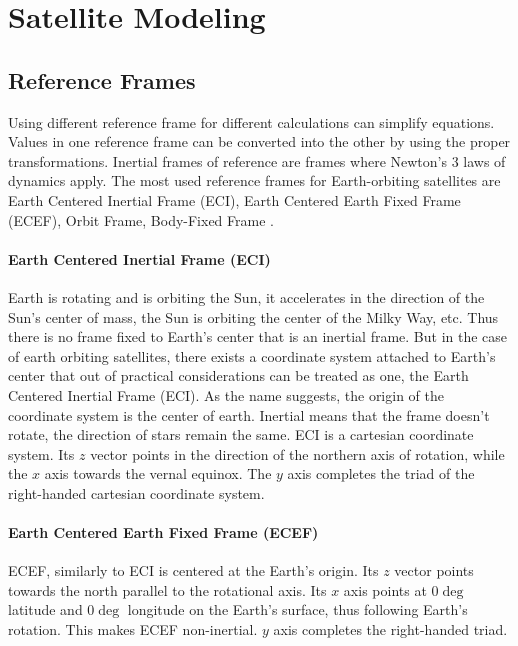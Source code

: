 \chapter{Satellite Modeling}

\section{Reference Frames}

Using different reference frame for different calculations can simplify equations. Values in one reference frame can be converted into the other by using the proper transformations.
Inertial frames of reference are frames where Newton's 3 laws of dynamics apply.
The most used reference frames for Earth-orbiting satellites are Earth Centered Inertial Frame (ECI), Earth Centered Earth Fixed Frame (ECEF), Orbit Frame, Body-Fixed Frame  \cite{ref1} \cite{ref2}.

\subsubsection{Earth Centered Inertial Frame (ECI)}
Earth is rotating and is orbiting the Sun, it accelerates in the direction of the Sun's center of mass, the Sun is orbiting the center of the Milky Way, etc. Thus there is no frame fixed to Earth's center that is an inertial frame. But in the case of earth orbiting satellites, there exists a coordinate system attached to Earth's center that out of practical considerations can be treated as one, the Earth Centered Inertial Frame (ECI).
As the name suggests, the origin of the coordinate system is the center of earth. Inertial means that the frame doesn't rotate, the direction of stars remain the same. 
ECI is a cartesian coordinate system. Its $z$ vector points in the direction of the northern axis of rotation, while the $x$ axis towards the vernal equinox. The $y$ axis completes the triad of the right-handed cartesian coordinate system.




\subsubsection{Earth Centered Earth Fixed Frame (ECEF)}

ECEF, similarly to ECI is centered at the Earth's origin. Its $z$ vector points towards the north parallel to the rotational axis. Its $x$ axis points at $0\deg$ latitude and $0\deg$ longitude on the Earth's surface, thus following Earth's rotation. This makes ECEF non-inertial. $y$ axis completes the right-handed triad.

